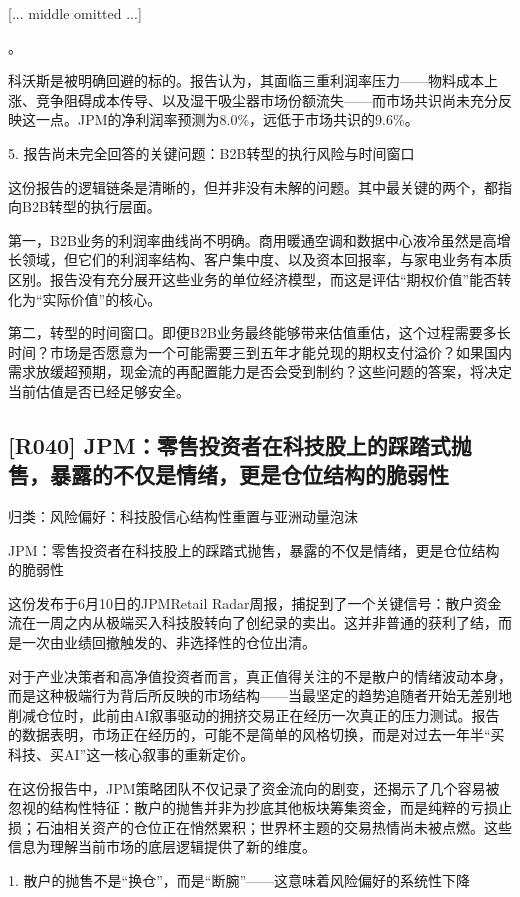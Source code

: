 \documentclass[11pt]{ctexart}
\begin{document}
[... middle omitted ...]

。

科沃斯是被明确回避的标的。报告认为，其面临三重利润率压力——物料成本上涨、竞争阻碍成本传导、以及湿干吸尘器市场份额流失——而市场共识尚未充分反映这一点。JPM的净利润率预测为8.0\%，远低于市场共识的9.6\%。

5. 报告尚未完全回答的关键问题：B2B转型的执行风险与时间窗口

这份报告的逻辑链条是清晰的，但并非没有未解的问题。其中最关键的两个，都指向B2B转型的执行层面。

第一，B2B业务的利润率曲线尚不明确。商用暖通空调和数据中心液冷虽然是高增长领域，但它们的利润率结构、客户集中度、以及资本回报率，与家电业务有本质区别。报告没有充分展开这些业务的单位经济模型，而这是评估“期权价值”能否转化为“实际价值”的核心。

第二，转型的时间窗口。即便B2B业务最终能够带来估值重估，这个过程需要多长时间？市场是否愿意为一个可能需要三到五年才能兑现的期权支付溢价？如果国内需求放缓超预期，现金流的再配置能力是否会受到制约？这些问题的答案，将决定当前估值是否已经足够安全。

\subsection{[R040] JPM：零售投资者在科技股上的踩踏式抛售，暴露的不仅是情绪，更是仓位结构的脆弱性}
{\small\color{refgray}归类：风险偏好：科技股信心结构性重置与亚洲动量泡沫}

JPM：零售投资者在科技股上的踩踏式抛售，暴露的不仅是情绪，更是仓位结构的脆弱性

这份发布于6月10日的JPMRetail Radar周报，捕捉到了一个关键信号：散户资金流在一周之内从极端买入科技股转向了创纪录的卖出。这并非普通的获利了结，而是一次由业绩回撤触发的、非选择性的仓位出清。

对于产业决策者和高净值投资者而言，真正值得关注的不是散户的情绪波动本身，而是这种极端行为背后所反映的市场结构——当最坚定的趋势追随者开始无差别地削减仓位时，此前由AI叙事驱动的拥挤交易正在经历一次真正的压力测试。报告的数据表明，市场正在经历的，可能不是简单的风格切换，而是对过去一年半“买科技、买AI”这一核心叙事的重新定价。

在这份报告中，JPM策略团队不仅记录了资金流向的剧变，还揭示了几个容易被忽视的结构性特征：散户的抛售并非为抄底其他板块筹集资金，而是纯粹的亏损止损；石油相关资产的仓位正在悄然累积；世界杯主题的交易热情尚未被点燃。这些信息为理解当前市场的底层逻辑提供了新的维度。

1. 散户的抛售不是“换仓”，而是“断腕”——这意味着风险偏好的系统性下降
\end{document}
